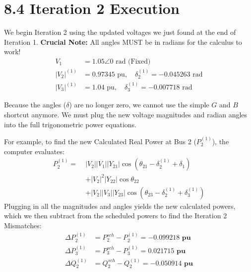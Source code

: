 \documentclass[11pt]{article}
\begin{document}
\newpage
\section*{8.4 Iteration 2 Execution}

\begin{stepbox}
We begin Iteration 2 using the updated voltages we just found at the end of Iteration 1. 
\textbf{Crucial Note:} All angles MUST be in radians for the calculus to work!
\begin{align*}
    V_1 &= 1.05 \angle 0 \text{ rad (Fixed)} \\
    |V_2|^{(1)} &= 0.97345 \text{ pu}, \quad \delta_2^{(1)} = -0.045263 \text{ rad} \\
    |V_3|^{(1)} &= 1.04 \text{ pu}, \quad \delta_3^{(1)} = -0.007718 \text{ rad}
\end{align*}
\end{stepbox}

\begin{stepbox}
Because the angles ($\delta$) are no longer zero, we cannot use the simple $G$ and $B$ shortcut anymore. We must plug the new voltage magnitudes and radian angles into the full trigonometric power equations. 

For example, to find the new Calculated Real Power at Bus 2 ($P_2^{(1)}$), the computer evaluates:
\begin{align*}
    P_2^{(1)} = \;&|V_2||V_1||Y_{21}|\cos(\theta_{21} - \delta_2^{(1)} + \delta_1) \\
    &+ |V_2|^2|Y_{22}|\cos\theta_{22} \\
    &+ |V_2||V_3||Y_{23}|\cos(\theta_{23} - \delta_2^{(1)} + \delta_3^{(1)})
\end{align*}
Plugging in all the magnitudes and angles yields the new calculated powers, which we then subtract from the scheduled powers to find the Iteration 2 Mismatches:
\begin{align*}
    \Delta P_2^{(1)} &= P_2^{sch} - P_2^{(1)} = \mathbf{-0.099218 \text{ pu}} \\
    \Delta P_3^{(1)} &= P_3^{sch} - P_3^{(1)} = \mathbf{0.021715 \text{ pu}} \\
    \Delta Q_2^{(1)} &= Q_2^{sch} - Q_2^{(1)} = \mathbf{-0.050914 \text{ pu}}
\end{align*}
\end{stepbox}
\end{document}
